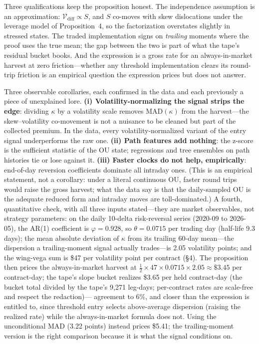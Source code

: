 \documentclass[11pt]{article}
\begin{document}
Three qualifications keep the proposition honest. The independence assumption is an
approximation: $\mathcal V_{\mathrm{diff}} \propto S$, and $S$ co-moves with skew dislocations
under the leverage model of Proposition~4, so the factorization overstates slightly in
stressed states. The traded implementation signs on \emph{trailing} moments where the proof
uses the true mean; the gap between the two is part of what the tape's residual bucket books.
And the expression is a gross rate for an always-in-market harvest at zero friction---whether
any threshold implementation clears its round-trip friction is an empirical question the
expression prices but does not answer.

Three observable corollaries, each confirmed in the data and each previously a piece of
unexplained lore. \textbf{(i) Volatility-normalizing the signal strips the edge}: dividing
$\kappa$ by a volatility scale removes $\mathrm{MAD}(\kappa)$ from the harvest---the
skew--volatility co-movement is not a nuisance to be cleaned but part of the collected
premium. In the data, every volatility-normalized variant of the entry signal underperforms
the raw one. \textbf{(ii) Path features add nothing}: the z-score is the sufficient statistic
of the OU state; regressions and tree ensembles on path histories tie or lose against it.
\textbf{(iii) Faster clocks do not help, empirically}: end-of-day
reversion coefficients dominate all intraday ones. (This is an empirical statement, not a
corollary: under a literal continuous OU, faster round trips would raise the gross harvest;
what the data say is that the daily-sampled OU is the adequate reduced form and intraday moves
are toll-dominated.) A fourth, quantitative check, with all
three inputs stated---they are market observables, not strategy parameters: on the daily
10-delta risk-reversal series (2020-09 to 2026-05), the AR(1) coefficient is $\varphi = 0.928$,
so $\theta = 0.0715$ per trading day (half-life 9.3 days); the mean absolute deviation of
$\kappa$ from its trailing 60-day mean---the dispersion a trailing-moment signal actually
trades---is 2.05 volatility points; and the wing-vega sum is \$47 per volatility point per
contract (\S4). The proposition then prices the always-in-market harvest at
$\tfrac12 \times 47 \times 0.0715 \times 2.05 \approx \$3.45$ per contract-day; the tape's
slope bucket realizes \$3.65 per held contract-day (the bucket total divided by the tape's
9{,}271 leg-days; per-contract rates are scale-free and respect the redaction)---
agreement to 6\%, and closer than the expression is entitled to, since threshold entry selects
above-average dispersion (raising the realized rate) while the always-in-market formula does
not. Using the unconditional MAD (3.22 points) instead prices \$5.41; the trailing-moment
version is the right comparison because it is what the signal conditions on.
\end{document}
